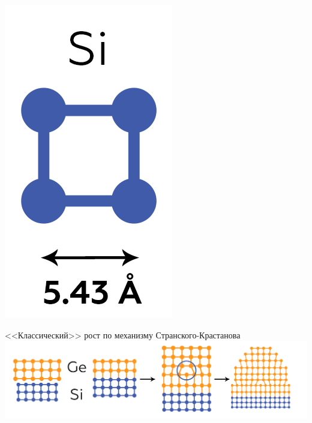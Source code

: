 \documentclass[10pt,pdf,hyperref={unicode}, dvipsnames]{beamer}
\begin{document}
\begin{frame}[t]
\begin{minipage}{0.15\linewidth}
		\includegraphics[width=\linewidth]{imgs/Sicell.png}
		\vfill
	\end{minipage}
	\begin{minipage}{0.84\linewidth}
	\centering
		
		<<Классический>> рост по механизму Странского-Крастанова
		\includegraphics[width = \linewidth]{imgs/11st.png}
		

\end{minipage}
\end{frame}
\end{document}
